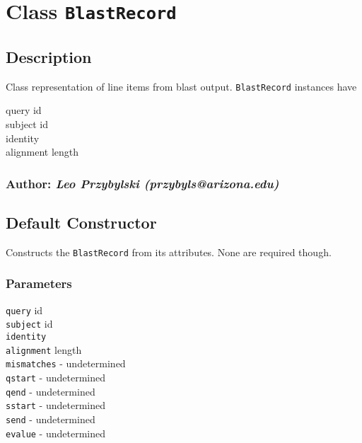 

\section{Class \texttt{BlastRecord}\label{Class_BlastRecord}}
\subsection*{Description\label{Description}}


Class representation of line items from blast output. \texttt{BlastRecord} instances 
have

\begin{description}

\item[{query id}] \mbox{}
\item[{subject id}] \mbox{}
\item[{identity}] \mbox{}
\item[{alignment length}] \mbox{}\end{description}
\subsubsection*{Author: \textit{Leo Przybylski (przybyls@arizona.edu)}\label{Author:_Leo_Przybylski_przybyls_arizona_edu_}}
\subsection*{Default Constructor\label{Default_Constructor}}


Constructs the \texttt{BlastRecord} from its attributes. None are required though.

\subsubsection*{Parameters\label{Parameters}}
\begin{description}

\item[{\texttt{query} id}] \mbox{}
\item[{\texttt{subject} id}] \mbox{}
\item[{\texttt{identity}}] \mbox{}
\item[{\texttt{alignment} length}] \mbox{}
\item[{\texttt{mismatches} - undetermined}] \mbox{}
\item[{\texttt{qstart} - undetermined}] \mbox{}
\item[{\texttt{qend} - undetermined}] \mbox{}
\item[{\texttt{sstart} - undetermined}] \mbox{}
\item[{\texttt{send} - undetermined}] \mbox{}
\item[{\texttt{evalue} - undetermined}] \mbox{}\end{description}
